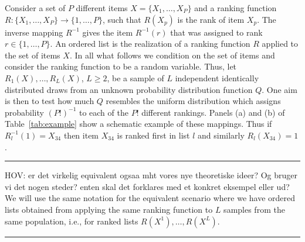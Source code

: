 \documentclass[12pt,a4paper]{article}
\theoremstyle{plain}
\begin{document}
Consider a set of $P$ different items $X=\{X_1,\dots,X_P\}$ and a
ranking function $R: \{X_1,\dots,X_P\}\to \{1,\dots,P\}$, such that
$R(X_p)$ is the rank of item $X_p$. The inverse mapping $R^{-1}$ gives
the item $R^{-1}(r)$ that was assigned to rank $r\in\{1,\dots,P\}$. An
ordered list is the realization of a ranking function $R$ applied to
the set of items $X$. In all what follows we condition on the set of
items and consider the ranking function to be a random variable. Thus,
let $R_1(X),\dots,R_L(X)$, $L\geq2$, be a sample of $L$ independent
identically distributed draws from an unknown probability distribution
function $Q$. One aim is then to test how much $Q$ resembles the
uniform distribution which assigns probability $(P!)^{-1}$ to each of
the $P!$ different rankings.
Panels (a) and (b) of
Table~\ref{tab:example} show a schematic example of these
mappings. Thus if $R_l^{-1}(1)=X_{34}$ then item $X_{34}$ is ranked
first in list $l$ and similarly $R_l(X_{34})=1$.

\bigskip\hrule HOV: er det virkelig equivalent ogsaa mht vores nye theoretiske
ideer? Og bruger vi det nogen steder?  enten skal det forklares med et
konkret eksempel eller ud?  We will use the same notation for the
equivalent scenario where we have ordered lists obtained from applying
the same ranking function to $L$ samples from the same population,
i.e., for ranked lists $R(X^1), \ldots, R(X^L)$.  
\hrule\bigskip
\end{document}
